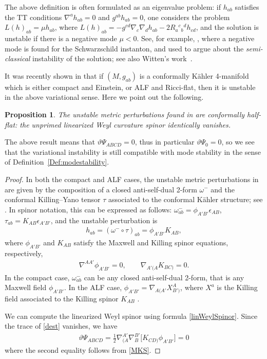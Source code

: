 \documentclass[10pt,a4paper]{amsart}
\numberwithin{equation}{section}
\newtheorem{Proposition}[Theorem]{Proposition}
\begin{document}
The above definition is often formulated as an eigenvalue problem: if $h_{ab}$ satisfies the TT conditions $\nabla^{a}h_{ab} = 0$ and $g^{ab}h_{ab} = 0$, one considers the problem $L(h)_{ab}=\mu h_{ab}$, where $L(h)_{ab}=-g^{cd}\nabla_{c}\nabla_{d}h_{ab}-2R_{a}{}^{c}{}_{b}{}^{d}h_{cd}$, and the solution is unstable if there is a negative mode $\mu<0$. See, for example, \cite[Section V]{Gross}, where a negative mode is found for the Schwarzschild instanton, and used to argue about the {\em semi-classical} instability of the solution; see also Witten's work~\cite{Witten}.

It was recently shown in \cite{BiquardOzuch} that if $(M,g_{ab})$ is a conformally K\"ahler 4-manifold which is either compact and Einstein, or ALF and Ricci-flat, then it is unstable in the above variational sense. Here we point out the following.
\begin{Proposition}
The unstable metric perturbations found in {\rm \cite{BiquardOzuch}} are conformally half-flat: the unprimed linearized Weyl curvature spinor identically vanishes.
\end{Proposition}

\begin{Remark}
The above result means that $\vartheta\Psi_{ABCD}=0$, thus in particular $\vartheta\Psi_0=0$, so we see that the variational instability is still compatible with mode stability in the sense of Definition~\ref{Def:modestability}.
\end{Remark}

\begin{proof}
In both the compact and ALF cases, the unstable metric perturbations in \cite{BiquardOzuch} are given by the composition of a closed anti-self-dual 2-form $\omega^{-}$ and the conformal Killing--Yano tensor $\tau$ associated to the conformal K\"ahler structure; see \cite{BiquardOzuch}. In spinor notation, this can be expressed as follows: $\omega^{-}_{ab}=\phi_{A'B'}\epsilon_{AB}$, $\tau_{ab}=K_{AB}\epsilon_{A'B'}$, and the unstable perturbation is
\begin{align} \label{dest}
h_{ab} = (\omega^{-}\circ\tau)_{ab} = \phi_{A'B'}K_{AB},
\end{align}
where $\phi_{A'B'}$ and $K_{AB}$ satisfy the Maxwell and Killing spinor equations, respectively,
\begin{align} \label{MKS}
\nabla^{AA'}\phi_{A'B'} = 0, \qquad \nabla_{A'(A}K_{BC)}=0.
\end{align}
In the compact case, $\omega^{-}_{ab}$ can be any closed anti-self-dual 2-form, that is any Maxwell field $\phi_{A'B'}$. In the ALF case, $\phi_{A'B'}=\nabla_{A(A'}X^{A}_{B')}$, where $X^a$ is the Killing field associated to the Killing spinor $K_{AB}$ \cite{BiquardOzuch}.

We can compute the linearized Weyl spinor using formula \eqref{linWeylSpinor}. Since the trace of \eqref{dest} vanishes, we have
\begin{align*}
\vartheta\Psi_{ABCD}
= \frac{1}{2}\nabla_{(A}^{A'}\nabla_{B}^{B'}\bigl[K_{CD)}\phi_{A'B'}\bigr]
= 0
\end{align*}
where the second equality follows from \eqref{MKS}.
\end{proof}
\end{document}

